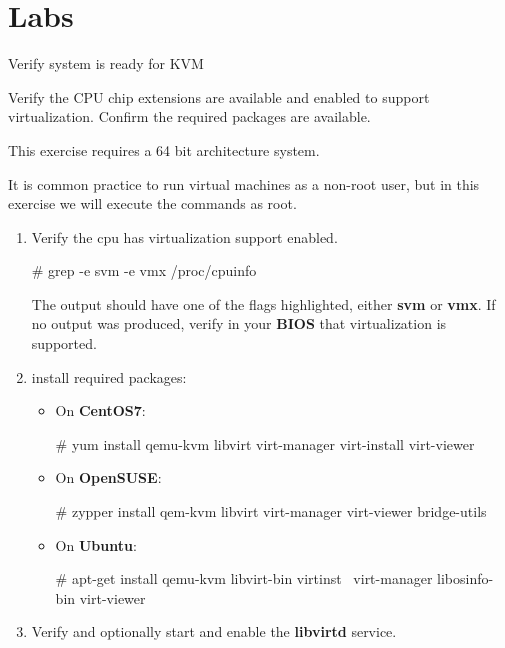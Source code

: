 \clearpage\section{Labs}\begin{Lab}

\begin{exe} {Verify system is ready for KVM }

   Verify the CPU chip extensions are available and enabled to support virtualization. 
   Confirm the required packages are available. 

   This exercise requires a 64 bit architecture system.

   It is common practice to run virtual machines as a non-root user, but in this
   exercise we will execute the commands as root.

   \begin{sol}
      \begin{enumerate}
         \item	Verify the cpu has virtualization support enabled.
		 \begin{raw}
# grep -e svm -e vmx /proc/cpuinfo 
		\end{raw} 
		      The output should have one of the flags highlighted, either 
		      \textbf{svm} or \textbf{vmx}. If no output was produced, verify 
		      in your \textbf{BIOS} that virtualization is supported. 
	\item install required packages:		      
         \begin{itemize}
            \item
            On \textbf{CentOS7}:
            \begin{raw}
# yum install qemu-kvm libvirt virt-manager virt-install virt-viewer 
	    \end{raw}
            \item
            On \textbf{OpenSUSE}:
            \begin{raw}
# zypper install qem-kvm libvirt virt-manager virt-viewer bridge-utils 
            \end{raw}
            \item
            On \textbf{Ubuntu}:
            \begin{raw}
# apt-get install qemu-kvm libvirt-bin virtinst \
		    virt-manager libosinfo-bin virt-viewer 
            \end{raw}
         \end{itemize}

         \item
         Verify and optionally start and enable the \textbf{libvirtd} service.


\end{enumerate}
\end{sol}
\end{exe}
\end{Lab}
